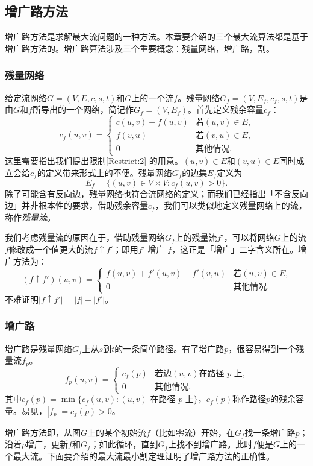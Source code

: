 \documentclass{ctexbook}
\begin{document}
  \subsection{增广路方法}
  增广路方法是求解最大流问题的一种方法。本章要介绍的三个最大流算法都是基于增广路方法的。增广路算法涉及三个重要概念：残量网络，增广路，割。
  \subsubsection*{残量网络}
  给定流网络$G=(V,E,c,s,t)$和$G$上的一个流$f$。残量网络$G_f=(V,E_f,c_f, s, t)$是由$G$和$f$所导出的一个网络，简记作$G_f=(V,E_f)$。首先定义残余容量$c_f$：
  \[
  c_f(u,v) =
  \begin{cases}
    c(u,v) - f(u,v) & \text{若$(u,v)\in E$,}\\
    f(v,u) & \text{若$(v,u)\in E$,} \\
    0 & \text{其他情况.}
  \end{cases}
  \]
  这里需要指出我们提出限制\ref{Restrict:2} 的用意。$(u,v)\in E$和$(v,u)\in E$同时成立会给$c_f$的定义带来形式上的不便。残量网络$G_f$的边集$E_f$定义为
  \[
  E_f = \{(u,v)\in V\times V\colon c_f(u,v)>0\}.
  \]
  除了可能含有反向边，残量网络也符合流网络的定义；而我们已经指出「不含反向边」并非根本性的要求，借助残余容量$c_f$，我们可以类似地定义残量网络上的流，称作\emph{残量流}。

  我们考虑残量流的原因在于，借助残量网络$G_f$上的残量流$f'$，可以将网络$G$上的流$f$修改成一个值更大的流$f\uparrow f'$；即用$f'$ 增广 $f$，这正是「增广」二字含义所在。增广方法为：
  \[
  (f\uparrow f')(u,v) =\begin{cases}
  f(u,v) + f'(u,v) - f'(v,u) & \text{若$(u,v)\in E$,} \\
  0 & \text{其他情况.}
\end{cases}
  \]
  不难证明$|f\uparrow f'| = |f| + |f'|$。
  \subsubsection{增广路}
  增广路是残量网络$G_f$上从$s$到$t$的一条简单路径。有了增广路$p$，很容易得到一个残量流$f_p$。
  \[
  f_p(u,v) =\begin{cases}
  c_f(p) & \text{若边$(u,v)$在路径 $p$ 上,}\\
  0 & \text{其他情况.}
\end{cases}
  \]
  其中$c_f(p) = \min\{c_f(u,v)\colon (u,v)\text{ 在路径 }p\text{ 上} \}$，$c_f(p)$称作路径$p$的残余容量。易见，$|f_p| = c_f(p) > 0$。

  增广路方法即，从图$G$上的某个初始流$f$（比如零流）开始，在$G_f$找一条增广路$p$；沿着$p$增广，更新$f$和$G_f$；如此循环，直到$G_f$上找不到增广路。此时$f$便是$G$上的一个最大流。下面要介绍的最大流最小割定理证明了增广路方法的正确性。
\end{document}
